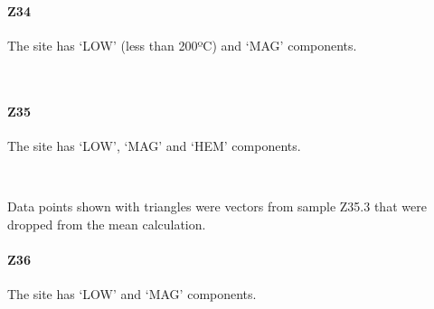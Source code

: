 \documentclass[11pt]{article}
\begin{document}
    \newpage
    
    \paragraph{Z34}\label{z34}

    The site has `LOW' (less than 200ºC) and `MAG' components.



    \begin{center}
    \end{center}
    { \hspace*{\fill} \\}
    
    \newpage
    
    \paragraph{Z35}\label{z35}

    The site has `LOW', `MAG' and `HEM' components.



    \begin{center}
    \end{center}
    { \hspace*{\fill} \\}
    
    Data points shown with triangles were vectors from sample Z35.3 that
were dropped from the mean calculation.

\newpage

    \paragraph{Z36}\label{z36}

    The site has `LOW' and `MAG' components.



    \begin{center}
    \end{center}
    { \hspace*{\fill} \\}
    
    \newpage
    
\end{document}
